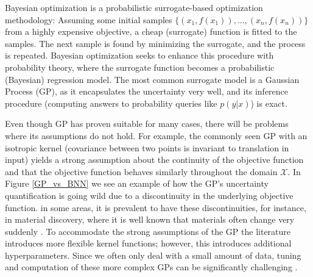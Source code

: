 Bayesian optimization is a probabilistic surrogate-based optimization methodology: Assuming some
initial samples $\{(x_1,f(x_1)), \dots, (x_n,f(x_n))\}$ from a highly expensive objective, a cheap
(surrogate) function is fitted to the samples. The next sample is found by
minimizing the surrogate, and the process is repeated. Bayesian optimization seeks to enhance this
procedure with probability theory, where the surrogate function becomes a probabilistic (Bayesian)
regression model. The most common surrogate model is a Gaussian Process (GP), as it encapsulates the
uncertainty very well, and its inference procedure (computing answers to probability queries like
$p(y|x)$) is exact.


Even though GP has proven suitable for many cases, there will be problems where its assumptions do
not hold. For example, the commonly seen GP with an isotropic kernel (covariance between two points
is invariant to translation in input) yields a strong assumption about the continuity of the
objective function and that the objective function behaves similarly throughout the domain
$\mathcal{X}$. In Figure \ref{GP_vs_BNN} we see an example of how the GP's uncertainty
quantification is going wild due to a discontinuity in the underlying objective function. in some
areas, it is prevalent to have these discontinuities, for instance, in material discovery, where it
is well known that materials often change very suddenly \cite{Nature_BO_paper}. To accommodate the
strong assumptions of the GP the literature introduces more flexible kernel functions; however, this
introduces additional hyperparameters. Since we often only deal with a small amount of data, tuning
and computation of these more complex GPs can be significantly challenging \cite{Nature_BO_paper}.

